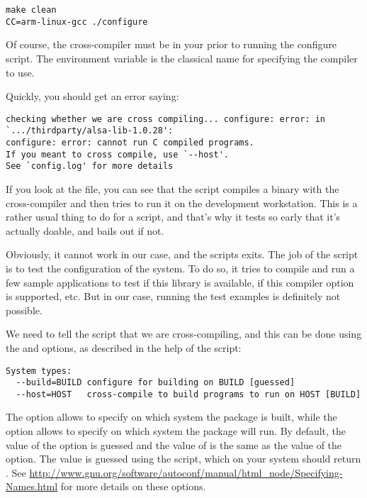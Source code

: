 \begin{verbatim}
make clean
CC=arm-linux-gcc ./configure
\end{verbatim}

Of course, the  cross-compiler must be in your
 prior to running the configure script. The  environment
variable is the classical name for specifying the compiler to
use.

Quickly, you should get an error saying:

\footnotesize
\begin{verbatim}
checking whether we are cross compiling... configure: error: in `.../thirdparty/alsa-lib-1.0.28':
configure: error: cannot run C compiled programs.
If you meant to cross compile, use `--host'.
See `config.log' for more details
\end{verbatim}
\normalsize

If you look at the  file, you can see that the
 script compiles a binary with the cross-compiler
and then tries to run it on the development workstation. This is a
rather usual thing to do for a  script, and that's
why it tests so early that it's actually doable, and bails out if not.

Obviously, it cannot work in our case, and the scripts exits. The job
of the  script is to test the configuration of the system. To
do so, it tries to compile and run a few sample applications to test
if this library is available, if this compiler option is supported,
etc. But in our case, running the test examples is definitely not
possible.

We need to tell the  script that we are cross-compiling, and
this can be done using the  and  options,
as described in the help of the  script:

\begin{verbatim}
System types:
  --build=BUILD	configure for building on BUILD [guessed]
  --host=HOST	cross-compile to build programs to run on HOST [BUILD]
\end{verbatim}

The  option allows to specify on which system the
package is built, while the  option allows to specify on
which system the package will run. By default, the value of the
 option is guessed and the value of  is the
same as the value of the  option. The value is guessed
using the  script, which on your system should
return . See
\url{http://www.gnu.org/software/autoconf/manual/html_node/Specifying-Names.html}
for more details on these options.

